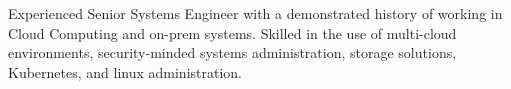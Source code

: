 
\begin{cvparagraph}

	{Experienced Senior Systems Engineer with a demonstrated history of working in Cloud Computing and on-prem systems. Skilled in the use of multi-cloud environments, security-minded systems administration, storage solutions, Kubernetes, and linux administration.}
	
\end{cvparagraph}